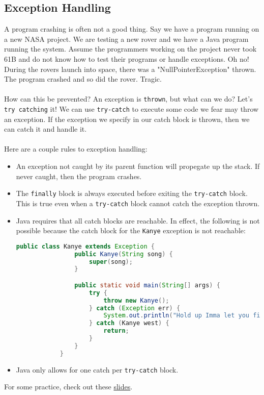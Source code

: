 \documentclass{article}
\begin{document}
    \subsection{Exception Handling}
    A program crashing is often not a good thing. Say we have a program running on a new NASA project. We are testing a new rover and we have a Java program running the system. Assume the programmers working on the project never took 61B and do not know how to test their programs or handle exceptions. Oh no! During the rovers launch into space, there was a "NullPointerException" thrown. The program crashed and so did the rover. Tragic. \\ \\
    How can this be prevented? An exception is \texttt{thrown}, but what can we do? Let's \texttt{try catching} it! We can use \texttt{try-catch} to execute some code we fear may throw an exception. If the exception we specify in our catch block is thrown, then we can catch it and handle it. \\ \\
    Here are a couple rules to exception handling:
    \begin{itemize}
        \item An exception not caught by its parent function will propegate up the stack. If never caught, then the program crashes.
        \item The \texttt{finally} block is always executed before exiting the \texttt{try-catch} block. This is true even when a \texttt{try-catch} block cannot catch the exception thrown.
        \item Java requires that all catch blocks are reachable. In effect, the following is not possible because the catch block for the \texttt{Kanye} exception is not reachable:
        \begin{lstlisting}[language=Java]
            public class Kanye extends Exception {
                public Kanye(String song) {
                    super(song);
                }

                public static void main(String[] args) {
                    try {
                        throw new Kanye();
                    } catch (Exception err) {
                        System.out.println("Hold up Imma let you finish but...");
                    } catch (Kanye west) {
                        return;
                    }
                }
            }
        \end{lstlisting}
        \item Java only allows for one catch per \texttt{try-catch} block.
    \end{itemize}
    For some practice, check out these \href{https://docs.google.com/presentation/d/1OZWm1p1TR8jsB2yGuj2cMGHY-ADyuyJLGc0K6o5C-uc/edit?usp=sharing}{slides}.

%
%
%
\end{document}
